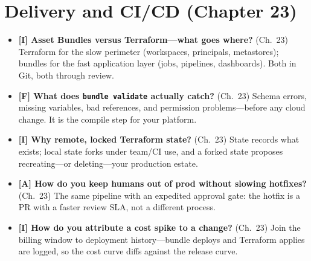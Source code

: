 \section{Delivery and CI/CD (Chapter 23)}
%
\begin{itemize}
    \item \textbf{[I] Asset Bundles versus Terraform---what goes where?} (Ch.~23) Terraform
    for the slow perimeter (workspaces, principals, metastores); bundles for the fast
    application layer (jobs, pipelines, dashboards). Both in Git, both through review.
    \item \textbf{[F] What does \texttt{bundle validate} actually catch?} (Ch.~23) Schema
    errors, missing variables, bad references, and permission problems---before any cloud
    change. It is the compile step for your platform.
    \item \textbf{[I] Why remote, locked Terraform state?} (Ch.~23) State records what exists;
    local state forks under team/CI use, and a forked state proposes recreating---or
    deleting---your production estate.
    \item \textbf{[A] How do you keep humans out of prod without slowing hotfixes?} (Ch.~23)
    The same pipeline with an expedited approval gate: the hotfix is a PR with a faster review
    SLA, not a different process.
    \item \textbf{[I] How do you attribute a cost spike to a change?} (Ch.~23) Join the
    billing window to deployment history---bundle deploys and Terraform applies are logged, so
    the cost curve diffs against the release curve.
\end{itemize}

